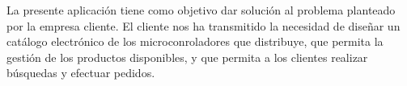 La presente aplicación tiene como objetivo dar solución al problema planteado por la empresa cliente.
El cliente nos ha transmitido la necesidad de diseñar un catálogo electrónico de los microconroladores que distribuye, que permita la gestión de los productos disponibles, y que permita a los clientes realizar búsquedas y efectuar pedidos.